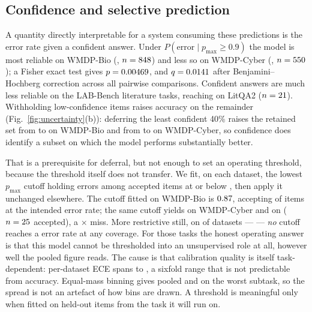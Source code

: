 \documentclass[conference,compsoc]{IEEEtran}
\newcommand{\pmax}{p_{\max}}
\begin{document}
\subsection{Confidence and selective prediction}
\label{sec:selective}

A quantity directly interpretable for a system consuming these predictions is the error
rate given a confident answer. Under $P(\text{error} \mid \pmax \geq 0.9)$ the model is
most reliable on WMDP-Bio (\statErrGivenHiBio{}, $n=848{}$) and less so on
WMDP-Cyber (\statErrGivenHiCyber{}, $n=550{}$); a Fisher exact test gives $p =
0.00469{}$, and $q = 0.0141{}$ after Benjamini--Hochberg
correction across all pairwise comparisons. Confident answers are much less reliable on the
LAB-Bench literature tasks, reaching \statErrGivenHiLitQA{} on LitQA2 ($n=21{}$).
Withholding low-confidence items raises accuracy on the remainder
(Fig.~\ref{fig:uncertainty}(b)): deferring the least confident 40\% raises the retained set
from \statAccBio{} to \statRCBioAtSixtyPct{} on WMDP-Bio and from \statAccCyber{} to
\statRCCyberAtSixtyPct{} on WMDP-Cyber, so confidence does identify a subset on which the
model performs substantially better.

That is a prerequisite for deferral, but not enough to set an operating threshold, because
the threshold itself does not transfer. We fit, on each dataset, the lowest $\pmax$ cutoff
holding errors among accepted items at or below \statThrTarget{}, then apply it unchanged
elsewhere. The cutoff fitted on WMDP-Bio is $0.87{}$, accepting
\statThrCovBio{} of items at the intended \statThrBioOnBio{} error rate; the same cutoff
yields \statThrBioOnCyber{} on WMDP-Cyber and \statThrBioWorst{} on
\statThrBioWorstLabel{} ($n = 25{}$ accepted), a
\statThrBioWorstRatio{}$\times$ miss. More restrictive still, on \statThrNUnachievable{} of
\statThrNDatasets{} datasets --- \statThrUnachievableList{} --- \emph{no} cutoff reaches a
\statThrTarget{} error rate at any coverage. For those tasks the honest operating answer is
that this model cannot be thresholded into an unsupervised role at all, however well the
pooled figure reads. The cause is that calibration quality is itself task-dependent:
per-dataset ECE spans \statEceSpreadMin{} to \statEceSpreadMax{}, a sixfold range that is
not predictable from accuracy. Equal-mass binning gives \statEceAdaptivePooled{} pooled and
\statEceAdaptiveSupp{} on the worst subtask, so the spread is not an artefact of how bins
are drawn. A threshold is meaningful only when fitted on held-out items from the task it
will run on.
\end{document}
